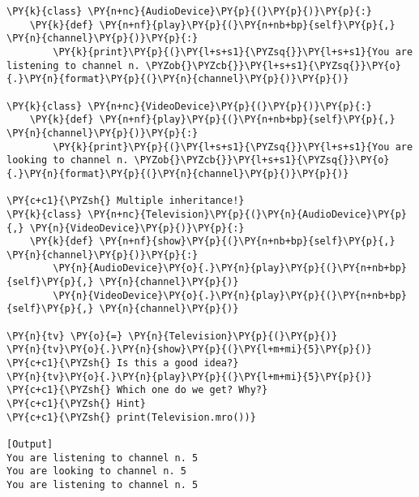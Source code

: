 \begin{Verbatim}[label=\makebox{\url{https://bitbucket.org/lbaldini/programming/src/tip/snippets/multiple\_inheritance.py}},commandchars=\\\{\}]
\PY{k}{class} \PY{n+nc}{AudioDevice}\PY{p}{(}\PY{p}{)}\PY{p}{:}
    \PY{k}{def} \PY{n+nf}{play}\PY{p}{(}\PY{n+nb+bp}{self}\PY{p}{,} \PY{n}{channel}\PY{p}{)}\PY{p}{:}
        \PY{k}{print}\PY{p}{(}\PY{l+s+s1}{\PYZsq{}}\PY{l+s+s1}{You are listening to channel n. \PYZob{}\PYZcb{}}\PY{l+s+s1}{\PYZsq{}}\PY{o}{.}\PY{n}{format}\PY{p}{(}\PY{n}{channel}\PY{p}{)}\PY{p}{)}

\PY{k}{class} \PY{n+nc}{VideoDevice}\PY{p}{(}\PY{p}{)}\PY{p}{:}
    \PY{k}{def} \PY{n+nf}{play}\PY{p}{(}\PY{n+nb+bp}{self}\PY{p}{,} \PY{n}{channel}\PY{p}{)}\PY{p}{:}
        \PY{k}{print}\PY{p}{(}\PY{l+s+s1}{\PYZsq{}}\PY{l+s+s1}{You are looking to channel n. \PYZob{}\PYZcb{}}\PY{l+s+s1}{\PYZsq{}}\PY{o}{.}\PY{n}{format}\PY{p}{(}\PY{n}{channel}\PY{p}{)}\PY{p}{)}

\PY{c+c1}{\PYZsh{} Multiple inheritance!}
\PY{k}{class} \PY{n+nc}{Television}\PY{p}{(}\PY{n}{AudioDevice}\PY{p}{,} \PY{n}{VideoDevice}\PY{p}{)}\PY{p}{:}
    \PY{k}{def} \PY{n+nf}{show}\PY{p}{(}\PY{n+nb+bp}{self}\PY{p}{,} \PY{n}{channel}\PY{p}{)}\PY{p}{:}
        \PY{n}{AudioDevice}\PY{o}{.}\PY{n}{play}\PY{p}{(}\PY{n+nb+bp}{self}\PY{p}{,} \PY{n}{channel}\PY{p}{)}
        \PY{n}{VideoDevice}\PY{o}{.}\PY{n}{play}\PY{p}{(}\PY{n+nb+bp}{self}\PY{p}{,} \PY{n}{channel}\PY{p}{)}
    
\PY{n}{tv} \PY{o}{=} \PY{n}{Television}\PY{p}{(}\PY{p}{)}
\PY{n}{tv}\PY{o}{.}\PY{n}{show}\PY{p}{(}\PY{l+m+mi}{5}\PY{p}{)}
\PY{c+c1}{\PYZsh{} Is this a good idea?}
\PY{n}{tv}\PY{o}{.}\PY{n}{play}\PY{p}{(}\PY{l+m+mi}{5}\PY{p}{)} \PY{c+c1}{\PYZsh{} Which one do we get? Why?}
\PY{c+c1}{\PYZsh{} Hint}
\PY{c+c1}{\PYZsh{} print(Television.mro())}

[Output]
You are listening to channel n. 5
You are looking to channel n. 5
You are listening to channel n. 5
\end{Verbatim}
